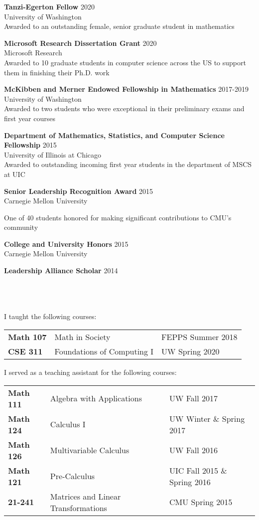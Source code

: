 \documentclass[12 pt]{article}
\newcommand{\lineunder}{\vspace*{-8pt} \\ \hspace*{-18pt} \hrulefill \\}
\newcommand{\header}[1]{{\hspace*{-15pt}\vspace*{6pt} \selectfont{\textsc{#1}}} \vspace*{-6pt} \lineunder}
\newcommand{\employer}[3]{{ \textbf{#1} \hfill #2 \\ #3\\  }}
\begin{document}
\employer{Tanzi-Egerton Fellow}{2020}{University of Washington}
\smallskip
Awarded to an outstanding female, senior graduate student in mathematics\\

\bigskip

\employer{Microsoft Research Dissertation Grant}{2020}{Microsoft Research}
Awarded to 10 graduate students in computer science across the US to support them in finishing their Ph.D. work
\bigskip

\employer{McKibben and Merner Endowed Fellowship in Mathematics}{2017-2019}{University of Washington}
\smallskip
Awarded to two students who were exceptional in their preliminary exams 
and first year courses\\
\bigskip

\employer{Department of Mathematics, Statistics, and Computer Science Fellowship}{2015}{University of Illinois at Chicago}
\smallskip
Awarded to outstanding incoming first year students in the department of MSCS at UIC\\
\bigskip


\employer{Senior Leadership Recognition Award}{2015}{Carnegie Mellon University}

\smallskip

One of 40 students honored for making significant contributions to CMU's community 
 \bigskip

 \employer{College and University Honors}{2015}{Carnegie Mellon University}

\bigskip

 \employer{Leadership Alliance Scholar}{2014}{~}


\header{Teaching}

I taught the following courses:
\begin{center}
	\begin{tabular}{ l l l }
	  \textbf{Math 107}& Math in Society & FEPPS Summer 2018 \\ 
	  \textbf{CSE 311}&	 Foundations of Computing I & UW Spring 2020 	
	\end{tabular}
\end{center}

I served as a teaching assistant for the following courses:
\begin{center}
	\begin{tabular}{ l l l }
	  \textbf{Math 111}& Algebra with Applications & UW Fall 2017 \\ 
	  \textbf{Math 124}&	 Calculus I & UW Winter  \& Spring 2017  \\  
	 \textbf{Math 126} &    Multivariable Calculus   & UW Fall 2016    \\
	\textbf{Math 121}	& Pre-Calculus	& UIC Fall 2015 \& Spring 2016\\	
	\textbf{21-241}	&	Matrices and Linear Transformations & CMU Spring 2015 	
	\end{tabular}
\end{center}
\end{document}
